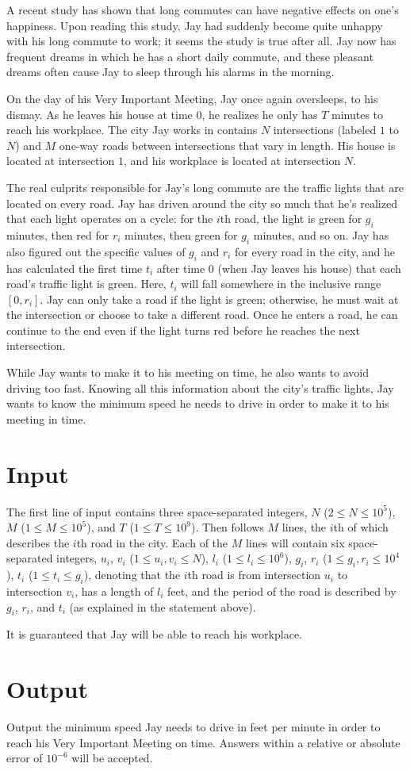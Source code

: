 
A recent study has shown that long commutes can have negative effects on one's happiness. Upon reading
this study, Jay had suddenly become quite unhappy with his long commute to work; it seems the study is
true after all. Jay now has frequent dreams in which he has a short daily commute, and these pleasant
dreams often cause Jay to sleep through his alarms in the morning.

On the day of his Very Important Meeting, Jay once again oversleeps, to his dismay. As he leaves his house
at time $0$, he realizes he only has $T$ minutes to reach his workplace. The city Jay works in contains
$N$ intersections (labeled $1$ to $N$) and $M$ one-way roads between intersections that vary in length.
His house is located at intersection $1$, and his workplace is located at intersection $N$.

The real culprits responsible for Jay's long commute are the traffic lights that are located on every road.
Jay has driven around the city so much that he's realized that each light operates on a cycle: for the $i$th
road, the light is green for $g_i$ minutes, then red for $r_i$ minutes, then green for $g_i$ minutes, and so 
on. Jay has also figured out the specific values of $g_i$ and $r_i$ for every road in the city, and he has
calculated the first time $t_i$ after time $0$ (when Jay leaves his house) that each road's traffic light is
green. Here, $t_i$ will fall somewhere in the inclusive range $[0, r_i]$. Jay can only take a road if the
light is green; otherwise, he must wait at the intersection or choose to take a different road. Once he
enters a road, he can continue to the end even if the light turns red before he reaches the next
intersection.

While Jay wants to make it to his meeting on time, he also wants to avoid driving too fast. Knowing all
this information about the city's traffic lights, Jay wants to know the minimum speed he needs to drive
in order to make it to his meeting in time.

\section*{Input}

The first line of input contains three space-separated integers, $N$ ($2 \leq N \leq 10^5$), $M$
($1 \leq M \leq 10^5$), and $T$ ($1 \leq T \leq 10^9$). Then follows $M$ lines, the $i$th of which
describes the $i$th road in the city. Each of the $M$ lines will contain six space-separated integers,
$u_i$, $v_i$ ($1 \leq u_i, v_i \leq N$), $l_i$ ($1 \leq l_i \leq 10^6$), $g_i$, $r_i$
($1 \leq g_i, r_i \leq 10^4$), $t_i$ ($1 \leq t_i \leq g_i$), denoting that the $i$th road is from
intersection $u_i$ to intersection $v_i$, has a length of $l_i$ feet, and the period of the road is
described by $g_i$, $r_i$, and $t_i$ (as explained in the statement above).

It is guaranteed that Jay will be able to reach his workplace.

\section*{Output}

Output the minimum speed Jay needs to drive in feet per minute in order to reach his Very Important Meeting
on time. Answers within a relative or absolute error of $10^{-6}$ will be accepted.
